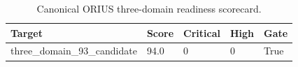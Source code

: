\begin{table}[htbp]
\centering
\caption{Canonical ORIUS three-domain readiness scorecard.}
\label{tbl:orius-submission-readiness}
\begin{tabular}{lllll}
\toprule
Target & Score & Critical & High & Gate\\
\midrule
three\_domain\_93\_candidate & 94.0 & 0 & 0 & True\\
\bottomrule
\end{tabular}
\end{table}
